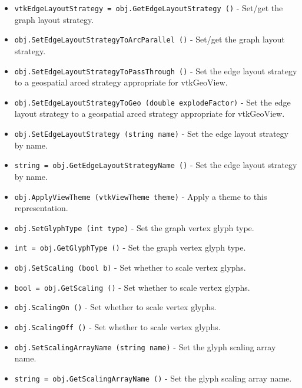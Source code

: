 \begin{itemize}
\item  \verb|vtkEdgeLayoutStrategy = obj.GetEdgeLayoutStrategy ()| -  Set/get the graph layout strategy.

\item  \verb|obj.SetEdgeLayoutStrategyToArcParallel ()| -  Set/get the graph layout strategy.

\item  \verb|obj.SetEdgeLayoutStrategyToPassThrough ()| -  Set the edge layout strategy to a geospatial arced strategy
 appropriate for vtkGeoView.

\item  \verb|obj.SetEdgeLayoutStrategyToGeo (double explodeFactor)| -  Set the edge layout strategy to a geospatial arced strategy
 appropriate for vtkGeoView.

\item  \verb|obj.SetEdgeLayoutStrategy (string name)| -  Set the edge layout strategy by name.

\item  \verb|string = obj.GetEdgeLayoutStrategyName ()| -  Set the edge layout strategy by name.

\item  \verb|obj.ApplyViewTheme (vtkViewTheme theme)| -  Apply a theme to this representation.

\item  \verb|obj.SetGlyphType (int type)| -  Set the graph vertex glyph type.

\item  \verb|int = obj.GetGlyphType ()| -  Set the graph vertex glyph type.

\item  \verb|obj.SetScaling (bool b)| -  Set whether to scale vertex glyphs.

\item  \verb|bool = obj.GetScaling ()| -  Set whether to scale vertex glyphs.

\item  \verb|obj.ScalingOn ()| -  Set whether to scale vertex glyphs.

\item  \verb|obj.ScalingOff ()| -  Set whether to scale vertex glyphs.

\item  \verb|obj.SetScalingArrayName (string name)| -  Set the glyph scaling array name.

\item  \verb|string = obj.GetScalingArrayName ()| -  Set the glyph scaling array name.


\end{itemize}
